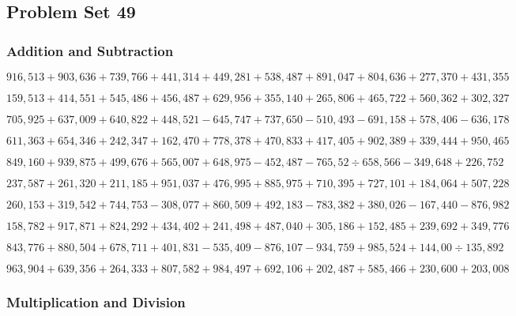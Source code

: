 \hypertarget{problem-set-49-4}{%
\subsection{Problem Set 49}\label{problem-set-49-4}}

\hypertarget{addition-and-subtraction-354}{%
\subsubsection{Addition and
Subtraction}\label{addition-and-subtraction-354}}

\(916,513+903,636+739,766+441,314+449,281+538,487+891,047+804,636+277,370+ 431,355\)

\(159,513+414,551+545,486+456,487+629,956+355,140+265,806+465,722+560,362+302,327\)

\(705,925+637,009+640,822+448,521-645,747+737,650-510,493-691,158+578,406-636,178\)

\(611,363+654,346+242,347+162,470+778,378+470,833+417,405+902,389+339,444+950,465\)

\(849,160+939,875+499,676+565,007+648,975-452,487-765,52÷658,566-349,648+226,752\)

\(237,587+261,320+211,185+951,037+476,995+885,975+710,395+727,101+184,064+507,228\)

\(260,153+319,542+744,753-308,077+860,509+492,183-783,382+380,026-167,440-876,982\)

\(158,782+917,871+824,292+434,402+241,498+487,040+305,186+152,485+239,692+349,776\)

\(843,776+880,504+678,711+401,831-535,409-876,107-934,759+985,524+144,00÷135,892\)

\(963,904+639,356+264,333+807,582+984,497+692,106+202,487+585,466+230,600+203,008\)

\hypertarget{multiplication-and-division-353}{%
\subsubsection{Multiplication and
Division}\label{multiplication-and-division-353}}

